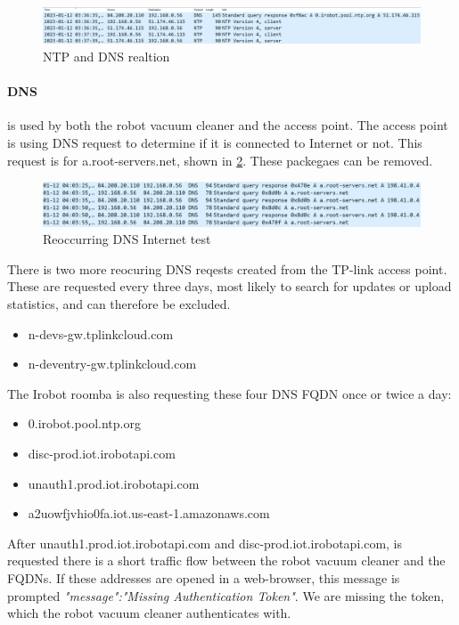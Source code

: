 \begin{figure}[H]
    \centering
    \includegraphics[width=\textwidth]{figures/ntp_dns.png}
    \caption{NTP and DNS realtion}
    \label{fig:ntp_dns}
\end{figure}

\paragraph{DNS} is used by both the robot vacuum cleaner and the access point. The access point is using DNS request to determine if it is connected to Internet or not. This request is for a.root-servers.net, shown in \ref{fig:dns_a-root}. These packegaes can be removed.

\begin{figure}[H]
    \centering
    \includegraphics[width=\textwidth]{figures/DNS_a-root.png}
    \caption{Reoccurring DNS Internet test}
    \label{fig:dns_a-root}
\end{figure}

There is two more reocuring DNS reqests created from the TP-link access point. These are requested every three days, most likely to search for updates or upload statistics, and can therefore be excluded.

\begin{itemize}
    \item n-devs-gw.tplinkcloud.com
    \item n-deventry-gw.tplinkcloud.com
\end{itemize}

The Irobot roomba is also requesting these four DNS FQDN once or twice a day: 
\begin{itemize}
    \item 0.irobot.pool.ntp.org
    \item disc-prod.iot.irobotapi.com
    \item unauth1.prod.iot.irobotapi.com
    \item a2uowfjvhio0fa.iot.us-east-1.amazonaws.com
\end{itemize}

After unauth1.prod.iot.irobotapi.com and disc-prod.iot.irobotapi.com, is requested there is a short traffic flow between the robot vacuum cleaner and the FQDNs. If these addresses are opened in a web-browser, this message is prompted \textit{"message":"Missing Authentication Token"}. We are missing the token, which the robot vacuum cleaner authenticates with. 

